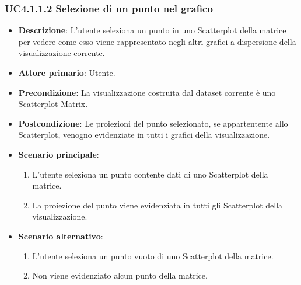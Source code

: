 \subsubsection{UC4.1.1.2 Selezione di un punto nel grafico}
\label{subsec:uc4.1.1}
\begin{itemize}
    \item \textbf{Descrizione}: L'utente seleziona un punto in uno Scatterplot della matrice per vedere come 
                                esso viene rappresentato negli altri grafici a dispersione della visualizzazione corrente.
	
    \item \textbf{Attore primario}: Utente.
    
    \item \textbf{Precondizione}:   La visualizzazione costruita dal dataset corrente è uno Scatterplot Matrix.
    \item \textbf{Postcondizione}:  Le proiezioni del punto selezionato, se appartentente allo Scatterplot, 
                                    venogno evidenziate in tutti i grafici della visualizzazione.

	\item \textbf{Scenario principale}:
        \begin{enumerate}
            \item L'utente seleziona un punto contente dati di uno Scatterplot della matrice.
            \item La proiezione del punto viene evidenziata in tutti gli Scatterplot della visualizzazione.
        \end{enumerate}

    \item \textbf{Scenario alternativo}:
        \begin{enumerate}
            \item L'utente seleziona un punto vuoto di uno Scatterplot della matrice.
            \item Non viene evidenziato alcun punto della matrice.
        \end{enumerate}

\end{itemize}


